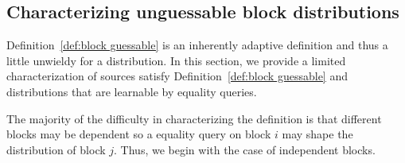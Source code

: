 \documentclass[11pt]{article}
\newcommand{\secref}[1]{\mbox{Section~\ref{#1}}}
\newcommand{\defref}[1]{\mbox{Definition~\ref{#1}}}
\newcommand{\lemref}[1]{\mbox{Lemma~\ref{#1}}}
\newcommand{\consref}[1]{\mbox{Construction~\ref{#1}}}
\newcommand{\authnote}[2]{{\textcolor{red}{\textsf{#1 notes: }\textcolor{blue}{ #2}}\marginpar{\textcolor{red}{\textbf{!!!!!}}}}}
\newcommand{\authnote}[2]{}
\newcommand{\bnote}[1]{{\authnote{Ben}{#1}}}
\begin{document}
%
%


\subsection{Characterizing unguessable block distributions}

\defref{def:block guessable} is an inherently adaptive definition and thus a little unwieldy for a distribution.  In this section, we provide a limited characterization of sources satisfy \defref{def:block guessable} and distributions that are learnable by equality queries.  

The majority of the difficulty in characterizing the definition is that different blocks may be dependent so a equality query on block $i$ may shape the distribution of block $j$.  Thus, we begin with the case of independent blocks.
\end{document}
